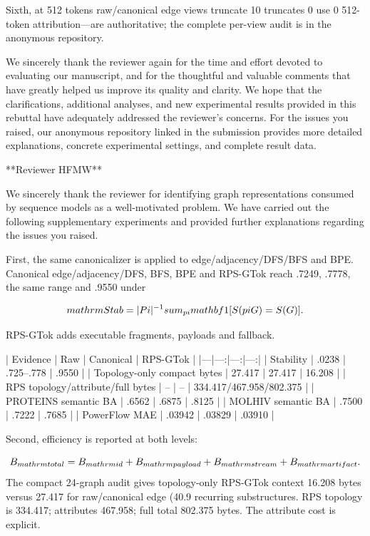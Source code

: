 Sixth, at 512 tokens raw/canonical edge views truncate 10%
truncates 0%
use 0%
512-token attribution---are authoritative; the complete per-view audit is in
the anonymous repository.

We sincerely thank the reviewer again for the time and effort devoted to
evaluating our manuscript, and for the thoughtful and valuable comments that
have greatly helped us improve its quality and clarity. We hope that the
clarifications, additional analyses, and new experimental results provided in
this rebuttal have adequately addressed the reviewer's concerns. For the
issues you raised, our anonymous repository linked in the submission provides
more detailed explanations, concrete experimental settings, and complete
result data.

**Reviewer HFMW**

We sincerely thank the reviewer for identifying graph representations consumed
by sequence models as a well-motivated problem. We have carried out the
following supplementary experiments and provided further explanations
regarding the issues you raised.

First, the same canonicalizer is applied to edge/adjacency/DFS/BFS and BPE.
Canonical edge/adjacency/DFS, BFS, BPE and RPS-GTok reach .7249, .7778, the
same range and .9550 under

$$
\\mathrm{Stab}=|\\Pi|^{-1}\\sum_{\\pi}\\mathbf{1}[S(\\pi G)=S(G)].
$$

RPS-GTok adds executable fragments, payloads and fallback.

| Evidence | Raw | Canonical | RPS-GTok |
|---|---:|---:|---:|
| Stability | .0238 | .725--.778 | .9550 |
| Topology-only compact bytes | 27.417 | 27.417 | 16.208 |
| RPS topology/attribute/full bytes | -- | -- | 334.417/467.958/802.375 |
| PROTEINS semantic BA | .6562 | .6875 | .8125 |
| MOLHIV semantic BA | .7500 | .7222 | .7685 |
| PowerFlow MAE | .03942 | .03829 | .03910 |

Second, efficiency is reported at both levels:

$$
B_{\\mathrm{total}}=B_{\\mathrm{id}}+B_{\\mathrm{payload}}+B_{\\mathrm{stream}}+B_{\\mathrm{artifact}}.
$$
The compact 24-graph audit gives topology-only RPS-GTok context 16.208 bytes
versus 27.417 for raw/canonical edge (40.9%
recurring substructures. RPS topology is 334.417; attributes 467.958; full
total 802.375 bytes. The attribute cost is explicit.

